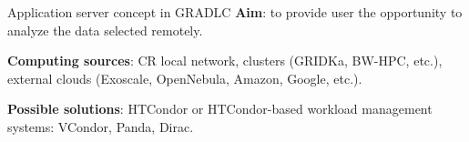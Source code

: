 
\begin{frame}{Application server concept in GRADLC}
\textbf{Aim}: to provide user the opportunity to analyze the data selected remotely.

\textbf{Computing sources}: CR local network, clusters (GRIDKa, BW-HPC, etc.), external clouds (Exoscale, OpenNebula, Amazon, Google, etc.).

\textbf{Possible solutions}: HTCondor or HTCondor-based workload management systems: VCondor, Panda, Dirac. 

\end{frame}




%  
